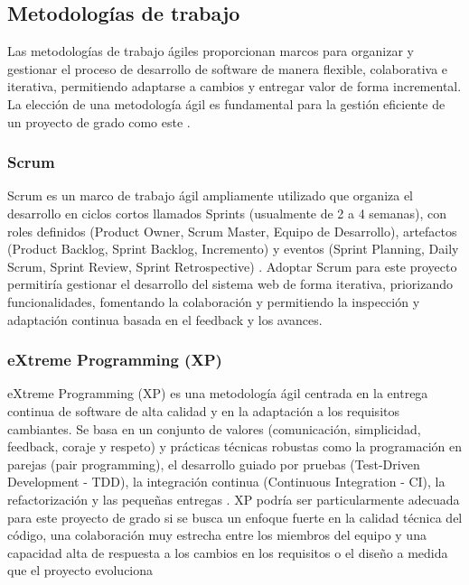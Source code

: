\subsection{Metodologías de trabajo}
Las metodologías de trabajo ágiles proporcionan marcos para organizar y gestionar el proceso de desarrollo de software de manera flexible, colaborativa e iterativa, permitiendo adaptarse a cambios y entregar valor de forma incremental.
La elección de una metodología ágil es fundamental para la gestión eficiente de un proyecto de grado como este \parencite{Beck2001}.

\subsubsection{Scrum}
Scrum es un marco de trabajo ágil ampliamente utilizado que organiza el desarrollo en ciclos cortos llamados Sprints (usualmente de 2 a 4 semanas), con roles definidos (Product Owner, Scrum Master, Equipo de Desarrollo), artefactos (Product Backlog, Sprint Backlog, Incremento) y eventos (Sprint Planning, Daily Scrum, Sprint Review, Sprint Retrospective) \parencite{SchwaberSutherland2020}.
Adoptar Scrum para este proyecto permitiría gestionar el desarrollo del sistema web de forma iterativa, priorizando funcionalidades, fomentando la colaboración y permitiendo la inspección y adaptación continua basada en el feedback y los avances.

\subsubsection{eXtreme Programming (XP)}
eXtreme Programming (XP) es una metodología ágil centrada en la entrega continua de software de alta calidad y en la adaptación a los requisitos cambiantes.
Se basa en un conjunto de valores (comunicación, simplicidad, feedback, coraje y respeto) y prácticas técnicas robustas como la programación en parejas (pair programming), el desarrollo guiado por pruebas (Test-Driven Development - TDD), la integración continua (Continuous Integration - CI), la refactorización y las pequeñas entregas \parencite{Beck2005}.
XP podría ser particularmente adecuada para este proyecto de grado si se busca un enfoque fuerte en la calidad técnica del código, una colaboración muy estrecha entre los miembros del equipo y una capacidad alta de respuesta a los cambios en los requisitos o el diseño a medida que el proyecto evoluciona
